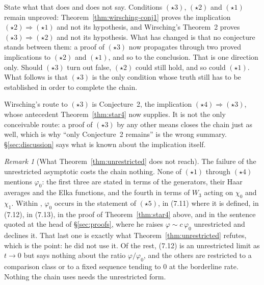\documentclass[11pt]{article}
\theoremstyle{definition}
\theoremstyle{remark}
\newtheorem{remark}[theorem]{Remark}
\begin{document}
State what that does and does not say. Conditions $(\star3)$,
$(\star2)$ and $(\star1)$ remain unproved: Theorem~\ref{thm:wirsching-conj1}
proves the implication $(\star2)\Rightarrow(\star1)$ and not its
hypothesis, and Wirsching's Theorem~2 proves
$(\star3)\Rightarrow(\star2)$ and not its hypothesis. What has changed
is that no conjecture stands between them: a proof of $(\star3)$ now
propagates through two proved implications to $(\star2)$ and
$(\star1)$, and so to the conclusion. That is one direction only.
Should $(\star3)$ turn out false, $(\star2)$ could still hold, and so
could $(\star1)$. What follows is that $(\star3)$ is the only condition
whose truth still has to be established in order to complete the
chain.

Wirsching's route to $(\star3)$ is Conjecture~2, the implication
$(\star4)\Rightarrow(\star3)$, whose antecedent
Theorem~\ref{thm:star4} now supplies. It is not the only conceivable
route: a proof of $(\star3)$ by any other means closes the chain just
as well, which is why ``only Conjecture~2 remains'' is the wrong
summary. \S\ref{sec:discussion} says what is known about the
implication itself.

\begin{remark}[What Theorem~\ref{thm:unrestricted} does not reach]
\label{rem:unrestricted-scope}
The failure of the unrestricted asymptotic costs the chain nothing.
None of $(\star1)$ through $(\star4)$ mentions $\varphi_0$: the first
three are stated in terms of the generators, their Haar averages and
the Elka functions, and the fourth in terms of $W_3$ acting on $\chi_0$
and $\chi_1$. Within \cite[\S7]{Wirsching2003}, $\varphi_0$ occurs in
the statement of $(\star5)$, in (7.11) where it is defined, in (7.12),
in (7.13), in the proof of Theorem~\ref{thm:star4} above, and in the
sentence quoted at the head of \S\ref{sec:proofs}, where he raises
$\varphi\sim c\,\varphi_0$ unrestricted and declines it. That last one
is exactly what Theorem~\ref{thm:unrestricted} refutes, which is the
point: he did not use it. Of the rest, (7.12) is an unrestricted limit
as $t\to0$ but says nothing about the ratio $\varphi/\varphi_0$, and
the others are restricted to a comparison class or to a fixed sequence
tending to $0$ at the borderline rate. Nothing the chain uses needs the
unrestricted form.
\end{remark}
\end{document}
